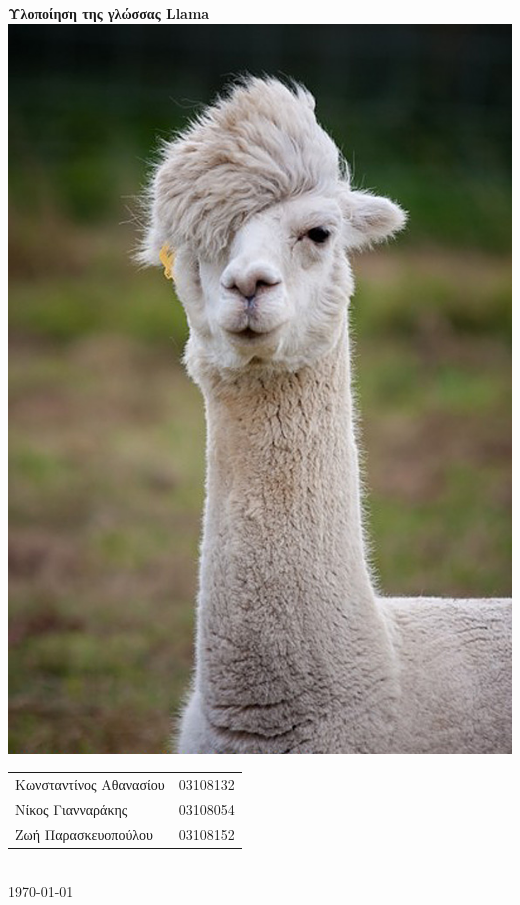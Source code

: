 \documentclass[12pt]{article}
\newcommand{\Llama}{\textsf{Llama }}
\begin{document}
\begin{titlepage}
\begin{center}
\vspace{1.5em}
{\LARGE \textbf{Υλοποίηση της γλώσσας \Llama\\}}
\vspace{1cm}
\includegraphics[scale=0.4]{llama.jpg}\\
\vfill
\begin{tabular}{l l}
Kωνσταντίνος Αθανασίου & 03108132\\
Νίκος Γιανναράκης & 03108054 \\
Ζωή Παρασκευοπούλου & 03108152 \\
\end{tabular}\\
\bigskip
\today
\end{center}
\end{titlepage}
\tableofcontents

\pagebreak
\end{document}

